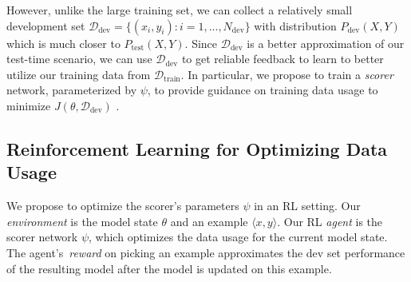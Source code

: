 However, unlike the large training set, we can collect a relatively small development set $\mathcal{D}_\text{dev}= \{(x_i, y_i): i = 1, ..., N_\text{dev}\}$ with distribution $P_{\text{dev}}(X, Y)$ which is much closer to $P_{\text{test}}(X, Y)$.
Since $\mathcal{D}_\text{dev}$ is a better approximation of our test-time scenario, we can use $\mathcal{D}_\text{dev}$ to get reliable feedback to learn to better utilize our training data from $\mathcal{D}_\text{train}$. In particular, we propose to train a \emph{scorer} network, parameterized by $\psi$, to provide guidance on training data usage to minimize $J(\theta, \mathcal{D}_\text{dev})$ .



\subsection{\label{sec:efficient_reward} Reinforcement Learning for Optimizing Data Usage}
We propose to optimize the scorer's parameters $\psi$ in an RL setting.
Our \emph{environment} is the model state $\theta$ and an example $\langle x, y \rangle$. Our RL \emph{agent} is the scorer network $\psi$, which optimizes the data usage for the current model state. The agent's~\emph{reward} on picking an example approximates the dev set performance of the resulting model after the model is updated on this example.

